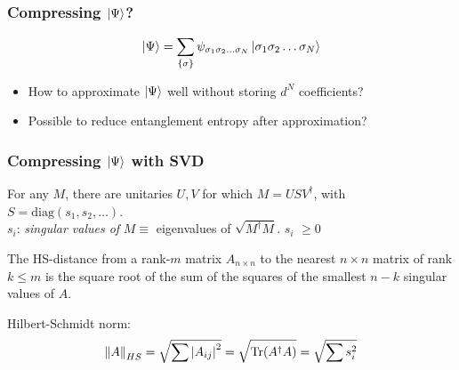 \documentclass{beamer}
\theoremstyle{definition}
\begin{document}
\begin{frame}
	\frametitle{Compressing $\ket{\Psi}$?}
	\begin{align*}
		\ket{\Psi} = \sum_{\{ \sigma \}} \psi_{\sigma_1\sigma_2\dots \sigma_N} \ket{\sigma_1\sigma_2\dots \sigma_N}
	\end{align*}

	\vspace{10pt}
	
	
	\begin{itemize}
		\item \pause How to approximate $\ket{\Psi}$ well without storing $d^N$ coefficients?
		
		\vspace{10pt}
		\item \pause Possible to reduce entanglement entropy after approximation?
	\end{itemize}
\end{frame}


\begin{frame}
	\frametitle{Compressing $\ket{\Psi}$ with SVD}
	
	\begin{theorem}
		For any $M$, there are unitaries  $U,V$ for which  $M = U S V^\dagger$, with $S = \text{diag}(s_1,s_2,\dots)$.\\
		\vspace{5pt}
		$s_i$: \textit{singular values of} $M \equiv$  eigenvalues of $\sqrt{M^\dagger M }$. $s_i$ $\geq 0$
	\end{theorem}
	
	
	\begin{theorem}
		The HS-distance from a rank-$m$ matrix $A_{n\times n}$ to the nearest $n\times n$ matrix of rank $k \leq m$  is the square root of the sum of the squares of the smallest $n-k$ singular values of $A$.
	\end{theorem}

	Hilbert-Schmidt norm:
	\begin{align*}
		\norm{A}_{HS} = \sqrt{\sum \abs{A_{ij}}^2} =  \sqrt{\Tr(A^\dagger A)} = \sqrt{\sum s_i^2}
	\end{align*} 
	
\end{frame}
\end{document}
